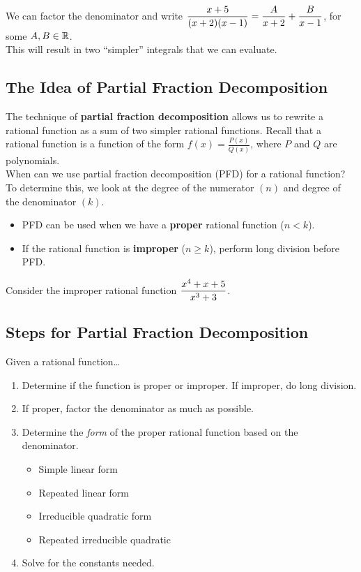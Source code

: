 \documentclass[12pt]{article}
\begin{document}
\vspace{4mm}

We can factor the denominator and write $\displaystyle\frac{x+5}{(x+2)(x-1)}=\frac{A}{x+2}+\frac{B}{x-1}$, for some $A,B\in\mathbb{R}$.\\

This will result in two ``simpler'' integrals that we can evaluate.

\newpage

\subsection*{The Idea of Partial Fraction Decomposition}

The technique of \textbf{partial fraction decomposition} allows us to rewrite a rational function as a sum of two simpler rational functions. Recall that a rational function is a function of the form $f(x)=\frac{P(x)}{Q(x)}$, where $P$ and $Q$ are polynomials.\\

When can we use partial fraction decomposition (PFD) for a rational function? To determine this, we look at the degree of the numerator $(n)$ and degree of the denominator $(k)$.
\begin{itemize}
	\item PFD can be used when we have a \textbf{proper} rational function ($n<k$).
	\item If the rational function is \textbf{improper} ($n\geq k$), perform long division before PFD.
	
\end{itemize}

\Example Consider the improper rational function $\displaystyle\frac{x^4+x+5}{x^3+3}$.

\vfill

\subsection*{Steps for Partial Fraction Decomposition}
Given a rational function\dots
\begin{enumerate}
	\item[\tc{1}] Determine if the function is proper or improper. If improper, do long division.
	\item[\tc{2}] If proper, factor the denominator as much as possible.
	\item[\tc{3}] Determine the \textit{form} of the proper rational function based on the denominator.
	\begin{itemize}
		\item Simple linear form
		\item Repeated linear form
		\item Irreducible quadratic form
		\item Repeated irreducible quadratic
	\end{itemize}
	\item[\tc{4}] Solve for the constants needed.
\end{enumerate}
\end{document}
